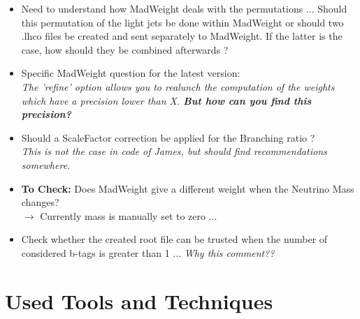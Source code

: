 \documentclass[a4paper,12pt]{book}
\begin{document}
\begin{itemize}
  \item Need to understand how MadWeight deals with the permutations ... Should this permutation of the light jets be done within MadWeight or should two .lhco files be created and sent separately to MadWeight. If the latter is the case, how should they be combined afterwards ?
  \item Specific MadWeight question for the latest version: \\ \textit{The 'refine' option allows you to realunch the computation of the weights which have a precision lower than X. \textbf{But how can you find this precision?}}
  \item Should a ScaleFactor correction be applied for the Branching ratio ? \\ \textit{This is not the case in code of James, but should find recommendations somewhere.}
  \item \textbf{To Check:} Does MadWeight give a different weight when the Neutrino Mass changes?\\ $\rightarrow$ Currently mass is manually set to zero ...
  \item Check whether the created root file can be trusted when the number of considered b-tags is greater than 1 ... \textit{Why this comment??}
\end{itemize}

\newpage
\chapter{Used Tools and Techniques}
\end{document}
